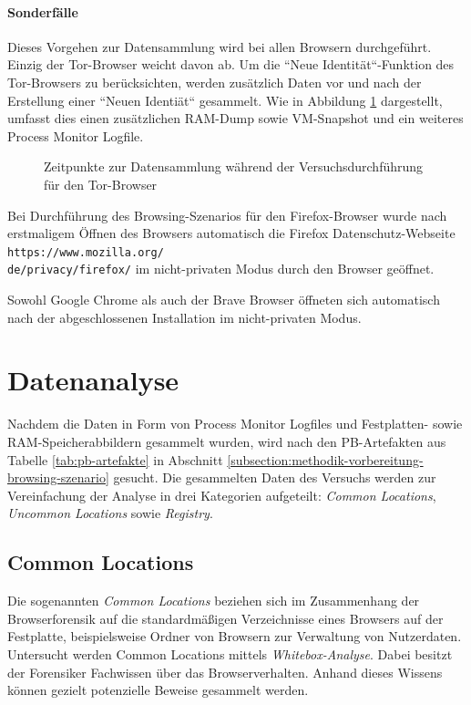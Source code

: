 \paragraph*{Sonderfälle}
Dieses Vorgehen zur Datensammlung wird bei allen Browsern durchgeführt. Einzig der Tor-Browser weicht davon ab. Um die ``Neue Identität``-Funktion des Tor-Browsers zu berücksichten, werden zusätzlich Daten vor und nach der Erstellung einer ``Neuen Identiät`` gesammelt. Wie in Abbildung \ref{img:zeitpunkte-datensammlung-tor} dargestellt, umfasst dies einen zusätzlichen RAM-Dump sowie VM-Snapshot und ein weiteres Process Monitor Logfile.
\begin{figure}[h!]
	\centering
	\small
	\centerline{\resizebox{\linewidth}{!}{}}
	\caption{Zeitpunkte zur Datensammlung während der Versuchsdurchführung für den Tor-Browser}
	\label{img:zeitpunkte-datensammlung-tor}
\end{figure}

Bei Durchführung des Browsing-Szenarios für den Firefox-Browser wurde nach erstmaligem Öffnen des Browsers automatisch die Firefox Datenschutz-Webseite \texttt{https://www.mozilla.org/\\
de/privacy/firefox/} im nicht-privaten Modus durch den Browser geöffnet. 

Sowohl Google Chrome als auch der Brave Browser öffneten sich automatisch nach der abgeschlossenen Installation im nicht-privaten Modus.

\section{Datenanalyse}
\label{section:methodik-datenanalyse}
Nachdem die Daten in Form von Process Monitor Logfiles und Festplatten- sowie RAM-Speicherabbildern gesammelt wurden, wird nach den PB-Artefakten aus Tabelle \ref{tab:pb-artefakte} in Abschnitt \ref{subsection:methodik-vorbereitung-browsing-szenario} gesucht. 
Die gesammelten Daten des Versuchs werden zur Vereinfachung der Analyse in drei Kategorien aufgeteilt: \textit{Common Locations}, \textit{Uncommon Locations} sowie \textit{Registry}.

\subsection{Common Locations}
\label{subsection:methodik-datenanalyse-commonlocations}
Die sogenannten \textit{Common Locations} beziehen sich im Zusammenhang der Browserforensik auf die standardmäßigen Verzeichnisse eines Browsers auf der Festplatte, beispielsweise Ordner von Browsern zur Verwaltung von Nutzerdaten.
Untersucht werden Common Locations mittels \textit{Whitebox-Analyse}. Dabei besitzt der Forensiker Fachwissen über das Browserverhalten. Anhand dieses Wissens können gezielt potenzielle Beweise gesammelt werden. \cite{Bonetti.2014}

